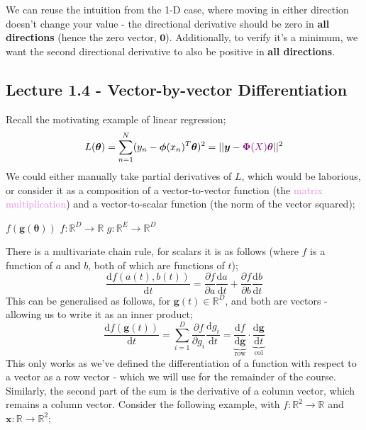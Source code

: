 \documentclass[a4paper, 12pt]{article}
\newcommand{\pdif}[2]{\frac{\partial #1}{\partial #2}}
\newcommand{\dif}[2]{\frac{\mathrm{d}#1}{\mathrm{d}#2}}
\newcommand{\summation}[2]{\sum\limits_{#1}^{#2}}
\newcommand{\mat}[1]{\boldsymbol{#1}}
\renewcommand{\vec}[1]{\boldsymbol{#1}}
\newcommand{\violet}[1]{\textcolor{violet}{#1}}
\begin{document}
            We can reuse the intuition from the 1-D case, where moving in either direction doesn't change your value - the directional derivative should be zero in \textbf{all directions} (hence the zero vector, $\vec{0}$).
            Additionally, to verify it's a minimum, we want the second directional derivative to also be positive in \textbf{all directions}.
        \subsection*{Lecture 1.4 - Vector-by-vector Differentiation}
            Recall the motivating example of linear regression;
            $$L(\vec{\theta}) = \summation{n = 1}{N}(y_n - \vec{\phi}(x_n)^T\vec{\theta})^2 = || \vec{y} - \violet{\mat{\Phi}(X) \vec{\theta}} ||^2$$
            We could either manually take partial derivatives of $L$, which would be laborious, or consider it as a composition of a vector-to-vector function (the \violet{matrix multiplication}) and a vector-to-scalar function (the norm of the vector squared);
            \begin{center}
                \hfill $f(\vec{g}(\vec{\theta}))$ \hfill $f : \mathbb{R}^D \to \mathbb{R}$ \hfill $g : \mathbb{R}^E \to \mathbb{R}^D$ \hfill
            \end{center}
            There is a multivariate chain rule, for scalars it is as follows (where $f$ is a function of $a$ and $b$, both of which are functions of $t$);
            $$\dif{f(a(t), b(t))}{t} = \pdif{f}{a} \dif{a}{t} + \pdif{f}{b} \dif{b}{t}$$
            This can be generalised as follows, for $\vec{g}(t) \in \mathbb{R}^D$, and both are vectors - allowing us to write it as an inner product;
            $$\dif{f(\vec{g}(t))}{t} = \summation{i = 1}{D} \pdif{f}{g_i} \dif{g_i}{t} = \underbrace{\dif{f}{\vec{g}}}_\text{row} \cdot \underbrace{\dif{\vec{g}}{t}}_\text{col}$$
            This only works as we've defined the differentiation of a function with respect to a vector as a row vector - which we will use for the remainder of the course.
            Similarly, the second part of the sum is the derivative of a column vector, which remains a column vector.
            Consider the following example, with $f : \mathbb{R}^2 \to \mathbb{R}$ and $\vec{x} : \mathbb{R} \to \mathbb{R}^2$;
\end{document}
